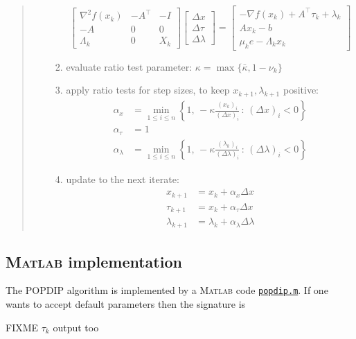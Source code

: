 \documentclass[11pt]{article}
\newcommand{\grad}{\nabla}
\newcommand{\Matlab}{\textsc{Matlab}\xspace}
\begin{document}
\begin{quote}
\begin{itemize}
\begin{enumerate}
$$\begin{bmatrix}
\grad^2 f(x_k) & -A^\top & -I \\
-A             & 0       & 0  \\
\Lambda_k      & 0       & X_k
\end{bmatrix}
\begin{bmatrix}
\Delta x \\
\Delta \tau \\
\Delta \lambda
\end{bmatrix}
=
\begin{bmatrix}
-\grad f(x_k) + A^\top \tau_k + \lambda_k \\
A x_k - b \\
\mu_k e - \Lambda_k x_k
\end{bmatrix}$$
    \item evaluate ratio test parameter: $\kappa = \max\{\bar\kappa,1-\nu_k\}$
    \item apply ratio tests for step sizes, to keep $x_{k+1},\lambda_{k+1}$ positive:
\begin{align*}
\alpha_x &= \min_{1\le i\le n} \left\{1, \,-\kappa \frac{(x_k)_i}{(\Delta x)_i} \,:\, (\Delta x)_i < 0\right\} \\
\alpha_\tau &= 1 \\
\alpha_\lambda &= \min_{1\le i\le n} \left\{1, \,-\kappa \frac{(\lambda_k)_i}{(\Delta \lambda)_i} \,:\, (\Delta \lambda)_i < 0\right\}
\end{align*}
    \item update to the next iterate:
\begin{align*}
x_{k+1} &= x_k + \alpha_x \Delta x \\
\tau_{k+1} &= x_k + \alpha_\tau \Delta x \\
\lambda_{k+1} &= \lambda_k + \alpha_\lambda \Delta \lambda
\end{align*}
    \end{enumerate}
\end{itemize}
\end{quote}



\subsection*{\Matlab implementation}

The POPDIP algorithm is implemented by a \Matlab code \href{https://github.com/bueler/popdip/blob/main/matlab/popdip.m}{\texttt{popdip.m}}.  If one wants to accept default parameters then the signature is

FIXME $\tau_k$ output too
\end{document}
